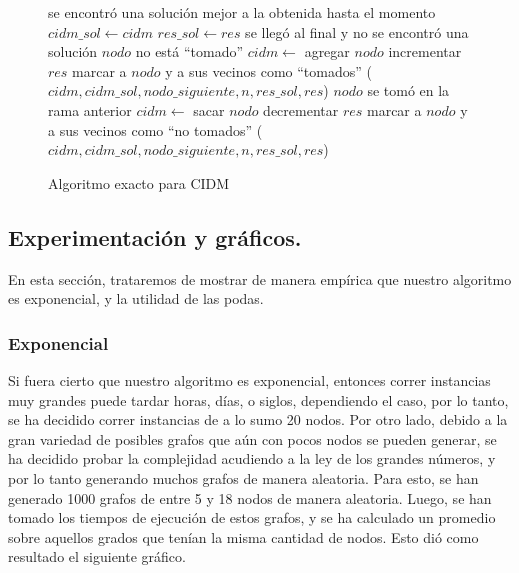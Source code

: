 \begin{figure}
\begin{codebox}
\li \If se encontró una solución mejor a la obtenida hasta el momento
\li \Then 
 		$cidm\_sol \leftarrow cidm$
\li 		$res\_sol \leftarrow res$ 		
\li 		\Return
	\End
\li \If se llegó al final y no se encontró una solución
\li \Then \Return
	\End
\li \If $nodo$ no está ``tomado''	
\li \Then
		$cidm \leftarrow$ agregar $nodo$
\li 		incrementar $res$
\li 		marcar a $nodo$ y a sus vecinos como ``tomados''
($cidm,cidm\_sol,nodo\_siguiente,n,res\_sol,res$)
	\End
\li 	\If $nodo$ se tomó en la rama anterior
\li 	\Then
		$cidm \leftarrow$ sacar $nodo$
\li		decrementar $res$
\li 		marcar a $nodo$ y a sus vecinos como ``no tomados''
	\End
{}($cidm,cidm\_sol,nodo\_siguiente,n,res\_sol,res$)
\end{codebox}
\caption{Algoritmo exacto para CIDM}\label{code:exacto}
\end{figure}

\vspace*{0.6cm}
\subsection{Experimentación y gráficos.}

\vspace*{0.3cm}
En esta sección, trataremos de mostrar de manera empírica que nuestro algoritmo es exponencial, y la utilidad de las podas.

\subsubsection{Exponencial}
\vspace*{0.3cm}

Si fuera cierto que nuestro algoritmo es exponencial, entonces correr instancias muy grandes puede tardar horas, días, o siglos, dependiendo el caso, por lo tanto, se ha decidido correr instancias de a lo sumo 20 nodos. Por otro lado, debido a la gran variedad de posibles grafos que aún con pocos nodos se pueden generar, se ha decidido probar la complejidad acudiendo a la ley de los grandes números, y por lo tanto generando muchos grafos de manera aleatoria. Para esto, se han generado 1000 grafos de entre 5 y 18 nodos de manera aleatoria. Luego, se han tomado los tiempos de ejecución de estos grafos, y se ha calculado un promedio sobre aquellos grados que tenían la misma cantidad de nodos. Esto dió como resultado el siguiente gráfico.


